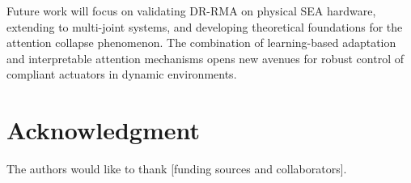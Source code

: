 \documentclass[lettersize,journal]{IEEEtran}
\begin{document}
Future work will focus on validating DR-RMA on physical SEA hardware, extending to multi-joint systems, and developing theoretical foundations for the attention collapse phenomenon. The combination of learning-based adaptation and interpretable attention mechanisms opens new avenues for robust control of compliant actuators in dynamic environments.

\section*{Acknowledgment}

The authors would like to thank [funding sources and collaborators].

 
 

%
\end{document}
